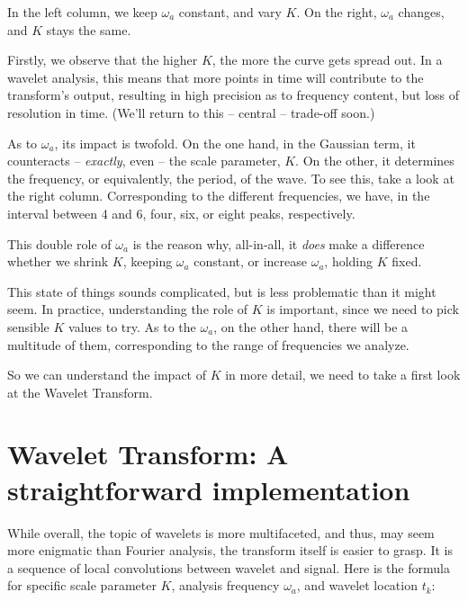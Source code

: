 \documentclass[
  letterpaper,
]{krantz}
\begin{document}
In the left column, we keep \(\omega_a\) constant, and vary \(K\). On
the right, \(\omega_a\) changes, and \(K\) stays the same.

Firstly, we observe that the higher \(K\), the more the curve gets
spread out. In a wavelet analysis, this means that more points in time
will contribute to the transform's output, resulting in high precision
as to frequency content, but loss of resolution in time. (We'll return
to this -- central -- trade-off soon.)

As to \(\omega_a\), its impact is twofold. On the one hand, in the
Gaussian term, it counteracts -- \emph{exactly}, even -- the scale
parameter, \(K\). On the other, it determines the frequency, or
equivalently, the period, of the wave. To see this, take a look at the
right column. Corresponding to the different frequencies, we have, in
the interval between 4 and 6, four, six, or eight peaks, respectively.

This double role of \(\omega_a\) is the reason why, all-in-all, it
\emph{does} make a difference whether we shrink \(K\), keeping
\(\omega_a\) constant, or increase \(\omega_a\), holding \(K\) fixed.

This state of things sounds complicated, but is less problematic than it
might seem. In practice, understanding the role of \(K\) is important,
since we need to pick sensible \(K\) values to try. As to the
\(\omega_a\), on the other hand, there will be a multitude of them,
corresponding to the range of frequencies we analyze.

So we can understand the impact of \(K\) in more detail, we need to take
a first look at the Wavelet Transform.

\hypertarget{wavelet-transform-a-straightforward-implementation}{%
\section{\texorpdfstring{Wavelet Transform: A straightforward
implementation}{Wavelet Transform: A straightforward implementation}}\label{wavelet-transform-a-straightforward-implementation}}

While overall, the topic of wavelets is more multifaceted, and thus, may
seem more enigmatic than Fourier analysis, the transform itself is
easier to grasp. It is a sequence of local convolutions between wavelet
and signal. Here is the formula for specific scale parameter \(K\),
analysis frequency \(\omega_a\), and wavelet location \(t_k\):
\end{document}
